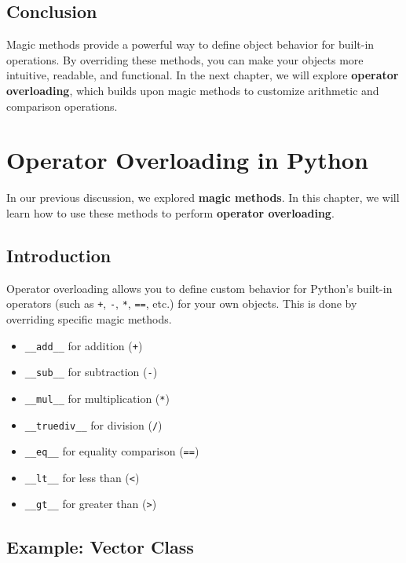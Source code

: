 \section{Conclusion}

Magic methods provide a powerful way to define object behavior for built-in operations. By overriding these methods, you can make your objects more intuitive, readable, and functional. In the next chapter, we will explore \textbf{operator overloading}, which builds upon magic methods to customize arithmetic and comparison operations.

\chapter{Operator Overloading in Python}

In our previous discussion, we explored \textbf{magic methods}. In this chapter, we will learn how to use these methods to perform \textbf{operator overloading}.

\section{Introduction}

Operator overloading allows you to define custom behavior for Python's built-in operators (such as \texttt{+}, \texttt{-}, \texttt{*}, \texttt{==}, etc.) for your own objects. This is done by overriding specific magic methods.

\begin{itemize}
    \item \texttt{\_\_add\_\_} for addition (\texttt{+})
    \item \texttt{\_\_sub\_\_} for subtraction (\texttt{-})
    \item \texttt{\_\_mul\_\_} for multiplication (\texttt{*})
    \item \texttt{\_\_truediv\_\_} for division (\texttt{/})
    \item \texttt{\_\_eq\_\_} for equality comparison (\texttt{==})
    \item \texttt{\_\_lt\_\_} for less than (\texttt{<})
    \item \texttt{\_\_gt\_\_} for greater than (\texttt{>})
\end{itemize}

\section{Example: Vector Class}

